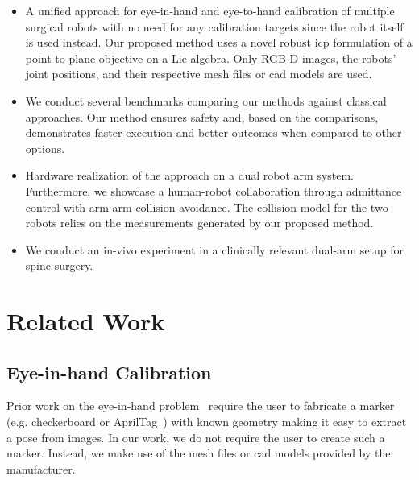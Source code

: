 \begin{itemize}
    \item A unified approach for eye-in-hand and eye-to-hand calibration of multiple surgical robots with no need for any calibration targets since the robot itself is used instead. Our proposed method uses a novel robust \gls{icp} formulation of a point-to-plane objective on a Lie algebra. Only RGB-D images, the robots' joint positions, and their respective mesh files or \gls{cad} models are used.
    \item We conduct several benchmarks comparing our methods against classical approaches. Our method ensures safety and, based on the comparisons, demonstrates faster execution and better outcomes when compared to other options.
    \item Hardware realization of the approach on a dual robot arm system. Furthermore, we showcase a human-robot collaboration through admittance control with arm-arm collision avoidance. The collision model for the two robots relies on the measurements generated by our proposed method.
    \item We conduct an in-vivo experiment in a clinically relevant dual-arm setup for spine surgery.
\end{itemize}




\section{Related Work}
\subsection{Eye-in-hand Calibration}
Prior work on the eye-in-hand problem~\cite{Horaud95, Strobl06} require the user to fabricate a marker (e.g. checkerboard or AprilTag~\cite{Olson11}) with known geometry making it easy to extract a pose from images. In our work, we do not require the user to create such a marker.
Instead, we make use of the mesh files or \gls{cad} models provided by the manufacturer.

